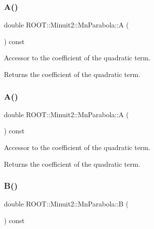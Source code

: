 \subsubsection{\texorpdfstring{A()}{A()}\hspace{0.1cm}{\footnotesize\ttfamily [2/3]}}
{\footnotesize\ttfamily double R\+O\+O\+T\+::\+Minuit2\+::\+Mn\+Parabola\+::A (\begin{DoxyParamCaption}{ }\end{DoxyParamCaption}) const\hspace{0.3cm}{\ttfamily [inline]}}

Accessor to the coefficient of the quadratic term.

\begin{DoxyReturn}{Returns}
the coefficient of the quadratic term. 
\end{DoxyReturn}
\mbox{\label{classROOT_1_1Minuit2_1_1MnParabola_ae5ca4bea19ba4c0243ca70bb6e55e827}} 
\subsubsection{\texorpdfstring{A()}{A()}\hspace{0.1cm}{\footnotesize\ttfamily [3/3]}}
{\footnotesize\ttfamily double R\+O\+O\+T\+::\+Minuit2\+::\+Mn\+Parabola\+::A (\begin{DoxyParamCaption}{ }\end{DoxyParamCaption}) const\hspace{0.3cm}{\ttfamily [inline]}}

Accessor to the coefficient of the quadratic term.

\begin{DoxyReturn}{Returns}
the coefficient of the quadratic term. 
\end{DoxyReturn}
\mbox{\label{classROOT_1_1Minuit2_1_1MnParabola_a878824850afd7ec98fd8685bec89784b}} 
\subsubsection{\texorpdfstring{B()}{B()}\hspace{0.1cm}{\footnotesize\ttfamily [1/3]}}
{\footnotesize\ttfamily double R\+O\+O\+T\+::\+Minuit2\+::\+Mn\+Parabola\+::B (\begin{DoxyParamCaption}{ }\end{DoxyParamCaption}) const\hspace{0.3cm}{\ttfamily [inline]}}

